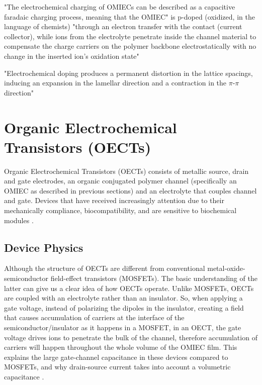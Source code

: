 "The electrochemical charging of OMIECs can be described as a capacitive faradaic charging process,
meaning that the OMIEC" is p-doped (oxidized, in the language of chemists) "through an electron transfer with the contact (current collector), while ions from the electrolyte penetrate inside the channel material to compensate the charge carriers on the polymer backbone electrostatically with no change in the inserted ion's oxidation state" \cite{giovannittiEnergeticControlRedoxActive2020}

"Electrochemical doping produces a permanent distortion in the lattice spacings, inducing an expansion in the lamellar direction and a contraction in the $\pi$-$\pi$ direction" \cite{cendraRoleAnionTransport2019}

\section{Organic Electrochemical Transistors (OECTs)} \label{sec:OECTs}

Organic Electrochemical Transistors (OECTs) consists of metallic source, drain and gate electrodes, an organic conjugated polymer channel (specifically an OMIEC as described in previous sections) and an electrolyte that couples channel and gate. Devices that have received increasingly attention due to their mechanically compliance, biocompatibility, and are sensitive to biochemical modules \cite{tanMixedIonicElectronic2022}. 



\subsection{Device Physics} \label{subsec:devphy}

Although the structure of OECTs are different from conventional metal-oxide-semiconductor field-effect transistors (MOSFETs). The basic understanding of the latter can give us a clear idea of how OECTs operate. Unlike MOSFETs, OECTs are coupled with an electrolyte rather than an insulator. So, when applying a gate voltage, instead of polarizing the dipoles in the insulator, creating a field that causes accumulation of carriers at the interface of the semiconductor/insulator as it happens in a MOSFET, in an OECT, the gate voltage drives ions to penetrate the bulk of the channel, therefore accumulation of carriers will happen throughout the whole volume of the OMIEC film. This explains the large gate-channel capacitance in these devices compared to MOSFETs, and why drain-source current takes into account a volumetric capacitance \cite{friedleinDevicePhysicsOrganic2018}.


